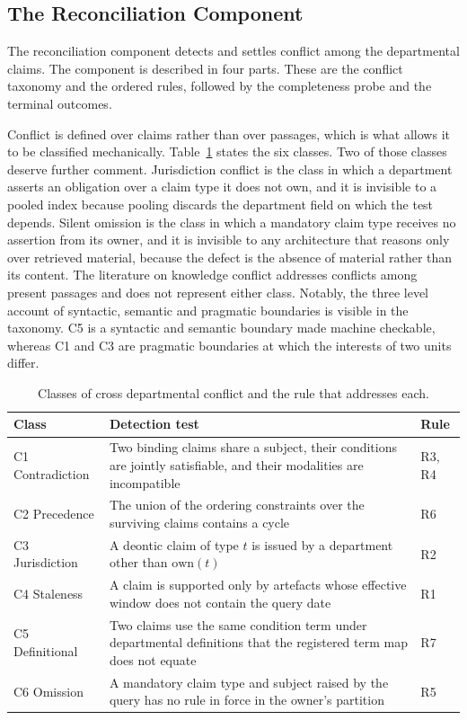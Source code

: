 \documentclass[journal]{IEEEtran}
\begin{document}
\subsection{The Reconciliation Component}

The reconciliation component detects and settles conflict among the departmental claims. The component is described in four parts. These are the conflict taxonomy and the ordered rules, followed by the completeness probe and the terminal outcomes.

Conflict is defined over claims rather than over passages, which is what allows it to be classified mechanically. Table~\ref{tab:conflicts} states the six classes. Two of those classes deserve further comment. Jurisdiction conflict is the class in which a department asserts an obligation over a claim type it does not own, and it is invisible to a pooled index because pooling discards the department field on which the test depends. Silent omission is the class in which a mandatory claim type receives no assertion from its owner, and it is invisible to any architecture that reasons only over retrieved material, because the defect is the absence of material rather than its content. The literature on knowledge conflict addresses conflicts among present passages \cite{xu2024conflicts} and does not represent either class. Notably, the three level account of syntactic, semantic and pragmatic boundaries \cite{carlile2004transforming} is visible in the taxonomy. C5 is a syntactic and semantic boundary made machine checkable, whereas C1 and C3 are pragmatic boundaries at which the interests of two units differ.

\begin{table}[!t]
\centering
\caption{Classes of cross departmental conflict and the rule that addresses each.}
\label{tab:conflicts}
\footnotesize
\begin{tabular}{@{}>{\raggedright\arraybackslash}p{}>{\raggedright\arraybackslash}p{}>{\raggedright\arraybackslash}p{}@{}}
\toprule
Class & Detection test & Rule \\
\midrule
C1 Contradiction & Two binding claims share a subject, their conditions are jointly satisfiable, and their modalities are incompatible & R3, R4 \\
C2 Precedence & The union of the ordering constraints over the surviving claims contains a cycle & R6 \\
C3 Jurisdiction & A deontic claim of type $t$ is issued by a department other than $\mathrm{own}(t)$ & R2 \\
C4 Staleness & A claim is supported only by artefacts whose effective window does not contain the query date & R1 \\
C5 Definitional & Two claims use the same condition term under departmental definitions that the registered term map does not equate & R7 \\
C6 Omission & A mandatory claim type and subject raised by the query has no rule in force in the owner's partition & R5 \\
\bottomrule
\end{tabular}
\end{table}
\end{document}
